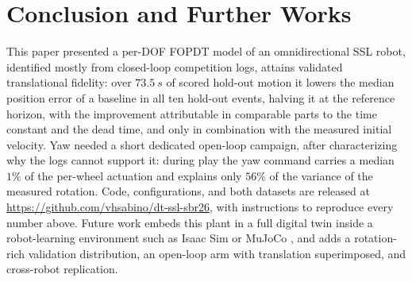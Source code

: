 \section{Conclusion and Further Works}
\label{sec:conclusion}

This paper presented a per-DOF FOPDT model of an omnidirectional SSL robot, identified mostly from closed-loop competition logs, attains validated translational fidelity: over $\SI{73.5}{s}$ of scored hold-out motion it lowers the median position error of a baseline in all ten hold-out events, halving it at the reference horizon, with the improvement attributable in comparable parts to the time constant and the dead time, and only in combination with the measured initial velocity.
Yaw needed a short dedicated open-loop campaign, after characterizing why the logs cannot support it: during play the yaw command carries a median $1\%$ of the per-wheel actuation and explains only $56\%$ of the variance of the measured rotation. Code, configurations, and both datasets are released at
\url{https://github.com/vhsabino/dt-ssl-sbr26}, with instructions to reproduce every number above. Future work embeds this plant in a full digital twin inside a robot-learning environment such as Isaac Sim or MuJoCo \cite{machado2025planning}, and adds a rotation-rich validation distribution, an open-loop arm with translation superimposed, and cross-robot replication.

